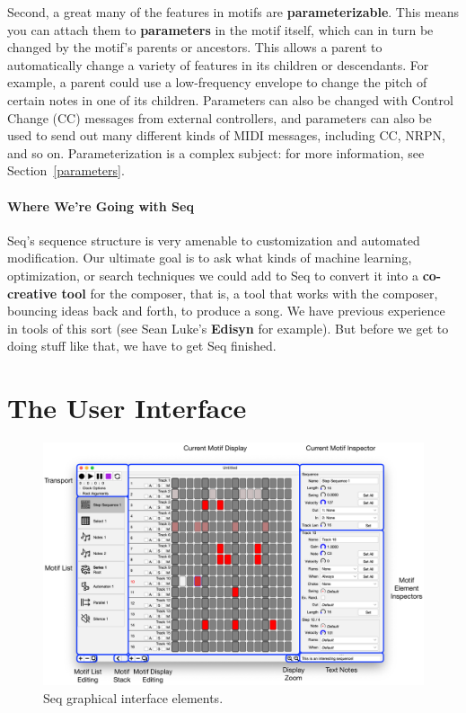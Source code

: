 \documentclass[twoside,10pt]{article}
\begin{document}
Second, a great many of the features in motifs are {\bf parameterizable}.  This means you can attach them to {\bf parameters} in the motif itself, which can in turn be changed by the motif's parents or ancestors.  This allows a parent to automatically change a variety of features in its children or descendants.  For example, a parent could use a low-frequency envelope to change the pitch of certain notes in one of its children.  Parameters can also be changed with Control Change (CC) messages from external controllers, and parameters can also be used to send out many different kinds of MIDI messages, including CC, NRPN, and so on.  Parameterization is a complex  subject: for more information, see Section~\ref{parameters}.

\paragraph{Where We're Going with Seq}

Seq's sequence structure is very amenable to customization and automated modification.  Our ultimate goal is to ask what kinds of machine learning, optimization, or search techniques we could add to Seq to convert it into a {\bf co-creative tool} for the composer, that is, a tool that works with the composer, bouncing ideas back and forth, to produce a song.  We have previous experience in tools of this sort (see Sean Luke's {\bf Edisyn} for example).  But before we get to doing stuff like that, we have to get Seq finished.

\clearpage\section{The User Interface}

\begin{figure}[b]
\centering
\includegraphics[width=6.5in]{MotifDisplay.pdf}
\caption{Seq graphical interface elements.}
\label{gui}
\end{figure}
\end{document}
